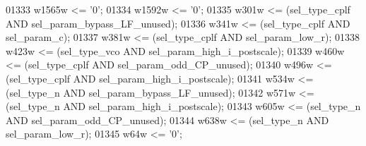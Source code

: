 \begin{DoxyCode}
{01333     \textcolor{vhdlchar}{w1565w} \textcolor{vhdlchar}{<=} \textcolor{vhdlchar}{'}\textcolor{vhdllogic}{}\textcolor{vhdllogic}{0}\textcolor{vhdlchar}{'};
01334     \textcolor{vhdlchar}{w1592w} \textcolor{vhdlchar}{<=} \textcolor{vhdlchar}{'}\textcolor{vhdllogic}{}\textcolor{vhdllogic}{0}\textcolor{vhdlchar}{'};
01335     \textcolor{vhdlchar}{w301w} \textcolor{vhdlchar}{<=} \textcolor{vhdlchar}{(}\textcolor{vhdlchar}{sel_type_cplf} \textcolor{keywordflow}{AND} \textcolor{vhdlchar}{sel_param_bypass_LF_unused}\textcolor{vhdlchar}{)};
01336     \textcolor{vhdlchar}{w341w} \textcolor{vhdlchar}{<=} \textcolor{vhdlchar}{(}\textcolor{vhdlchar}{sel_type_cplf} \textcolor{keywordflow}{AND} \textcolor{vhdlchar}{sel_param_c}\textcolor{vhdlchar}{)};
01337     \textcolor{vhdlchar}{w381w} \textcolor{vhdlchar}{<=} \textcolor{vhdlchar}{(}\textcolor{vhdlchar}{sel_type_cplf} \textcolor{keywordflow}{AND} \textcolor{vhdlchar}{sel_param_low_r}\textcolor{vhdlchar}{)};
01338     \textcolor{vhdlchar}{w423w} \textcolor{vhdlchar}{<=} \textcolor{vhdlchar}{(}\textcolor{vhdlchar}{sel_type_vco} \textcolor{keywordflow}{AND} \textcolor{vhdlchar}{sel_param_high_i_postscale}\textcolor{vhdlchar}{)};
01339     \textcolor{vhdlchar}{w460w} \textcolor{vhdlchar}{<=} \textcolor{vhdlchar}{(}\textcolor{vhdlchar}{sel_type_cplf} \textcolor{keywordflow}{AND} \textcolor{vhdlchar}{sel_param_odd_CP_unused}\textcolor{vhdlchar}{)};
01340     \textcolor{vhdlchar}{w496w} \textcolor{vhdlchar}{<=} \textcolor{vhdlchar}{(}\textcolor{vhdlchar}{sel_type_cplf} \textcolor{keywordflow}{AND} \textcolor{vhdlchar}{sel_param_high_i_postscale}\textcolor{vhdlchar}{)};
01341     \textcolor{vhdlchar}{w534w} \textcolor{vhdlchar}{<=} \textcolor{vhdlchar}{(}\textcolor{vhdlchar}{sel_type_n} \textcolor{keywordflow}{AND} \textcolor{vhdlchar}{sel_param_bypass_LF_unused}\textcolor{vhdlchar}{)};
01342     \textcolor{vhdlchar}{w571w} \textcolor{vhdlchar}{<=} \textcolor{vhdlchar}{(}\textcolor{vhdlchar}{sel_type_n} \textcolor{keywordflow}{AND} \textcolor{vhdlchar}{sel_param_high_i_postscale}\textcolor{vhdlchar}{)};
01343     \textcolor{vhdlchar}{w605w} \textcolor{vhdlchar}{<=} \textcolor{vhdlchar}{(}\textcolor{vhdlchar}{sel_type_n} \textcolor{keywordflow}{AND} \textcolor{vhdlchar}{sel_param_odd_CP_unused}\textcolor{vhdlchar}{)};
01344     \textcolor{vhdlchar}{w638w} \textcolor{vhdlchar}{<=} \textcolor{vhdlchar}{(}\textcolor{vhdlchar}{sel_type_n} \textcolor{keywordflow}{AND} \textcolor{vhdlchar}{sel_param_low_r}\textcolor{vhdlchar}{)};
01345     \textcolor{vhdlchar}{w64w} \textcolor{vhdlchar}{<=} \textcolor{vhdlchar}{'}\textcolor{vhdllogic}{}\textcolor{vhdllogic}{0}\textcolor{vhdlchar}{'};
}
\end{DoxyCode}
